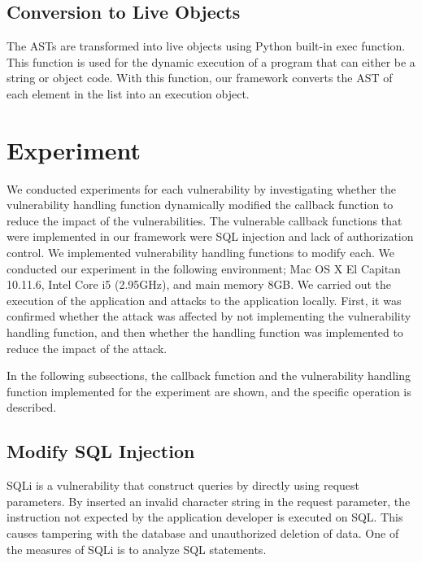 \documentclass[conference]{IEEEtran}
\begin{document}
\subsection{Conversion to Live Objects}
The ASTs are transformed into live objects using Python built-in exec function.
This function is used for the dynamic execution of a program that can either be a string or object code.
With this function, our framework converts the AST of each element in the list into an execution object.

\section{Experiment}
We conducted experiments for each vulnerability by investigating whether the vulnerability handling function dynamically modified the callback function to reduce the impact of the vulnerabilities.
The vulnerable callback functions that were implemented in our framework were SQL injection and lack of authorization control.
We implemented vulnerability handling functions to modify each.
We conducted our experiment in the following environment; Mac OS X El Capitan 10.11.6, Intel Core i5 (2.95GHz), and main memory 8GB.
We carried out the execution of the application and attacks to the application locally.
First, it was confirmed whether the attack was affected by not implementing the vulnerability handling function, and then whether the handling function was implemented to reduce the impact of the attack.

In the following subsections, the callback function and the vulnerability handling function implemented for the experiment are shown, and the specific operation is described.

\subsection{Modify SQL Injection}
SQLi is a vulnerability that construct queries by directly using request parameters.
By inserted an invalid character string in the request parameter, the instruction not expected by the application developer is executed on SQL.
This causes tampering with the database and unauthorized deletion of data.
One of the measures of SQLi is to analyze SQL statements.
\end{document}
